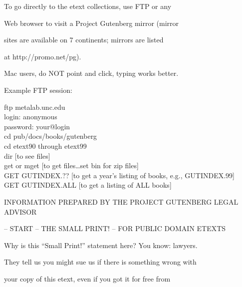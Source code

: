 \documentclass[12pt]{book}
\begin{document}
To go directly to the etext collections, use FTP or any

Web browser to visit a Project Gutenberg mirror (mirror

sites are available on 7 continents; mirrors are listed

at http://promo.net/pg).



Mac users, do NOT point and click, typing works better.



Example FTP session:



\noindent ftp metalab.unc.edu\\

login: anonymous\\

password: your@login\\

cd pub/docs/books/gutenberg\\

cd etext90 through etext99\\

dir [to see files]\\

get or mget [to get files\ldots set bin for zip files]\\

GET GUTINDEX.??  [to get a year's listing of books, e.g., GUTINDEX.99]\\

GET GUTINDEX.ALL [to get a listing of ALL books]\\



\newpage



\begin{center}

{\Large INFORMATION PREPARED BY THE PROJECT GUTENBERG LEGAL ADVISOR}

\end{center}





-- START -- THE SMALL PRINT! -- FOR PUBLIC DOMAIN ETEXTS



Why is this ``Small Print!'' statement here?  You know: lawyers.

They tell us you might sue us if there is something wrong with

your copy of this etext, even if you got it for free from
\end{document}
